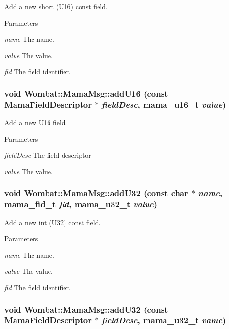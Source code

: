 Add a new short (U16) const field. 
\begin{DoxyParams}{Parameters}
\item[{\em name}]The name. \item[{\em value}]The value. \item[{\em fid}]The field identifier. \end{DoxyParams}
\hypertarget{classWombat_1_1MamaMsg_afba06052159be67eb3196bb97a1d5b5a}{
\subsubsection[{addU16}]{\setlength{\rightskip}{0pt plus 5cm}void Wombat::MamaMsg::addU16 (const {\bf MamaFieldDescriptor} $\ast$ {\em fieldDesc}, \/  mama\_\-u16\_\-t {\em value})}}
\label{classWombat_1_1MamaMsg_afba06052159be67eb3196bb97a1d5b5a}


Add a new U16 field. 
\begin{DoxyParams}{Parameters}
\item[{\em fieldDesc}]The field descriptor \item[{\em value}]The value. \end{DoxyParams}
\hypertarget{classWombat_1_1MamaMsg_ac90ad9badb8741f8d926d82a28415a61}{
\subsubsection[{addU32}]{\setlength{\rightskip}{0pt plus 5cm}void Wombat::MamaMsg::addU32 (const char $\ast$ {\em name}, \/  mama\_\-fid\_\-t {\em fid}, \/  mama\_\-u32\_\-t {\em value})}}
\label{classWombat_1_1MamaMsg_ac90ad9badb8741f8d926d82a28415a61}


Add a new int (U32) const field. 
\begin{DoxyParams}{Parameters}
\item[{\em name}]The name. \item[{\em value}]The value. \item[{\em fid}]The field identifier. \end{DoxyParams}
\hypertarget{classWombat_1_1MamaMsg_ae70a69e4203010eab4026d946a242601}{
\subsubsection[{addU32}]{\setlength{\rightskip}{0pt plus 5cm}void Wombat::MamaMsg::addU32 (const {\bf MamaFieldDescriptor} $\ast$ {\em fieldDesc}, \/  mama\_\-u32\_\-t {\em value})}}
\label{classWombat_1_1MamaMsg_ae70a69e4203010eab4026d946a242601}


